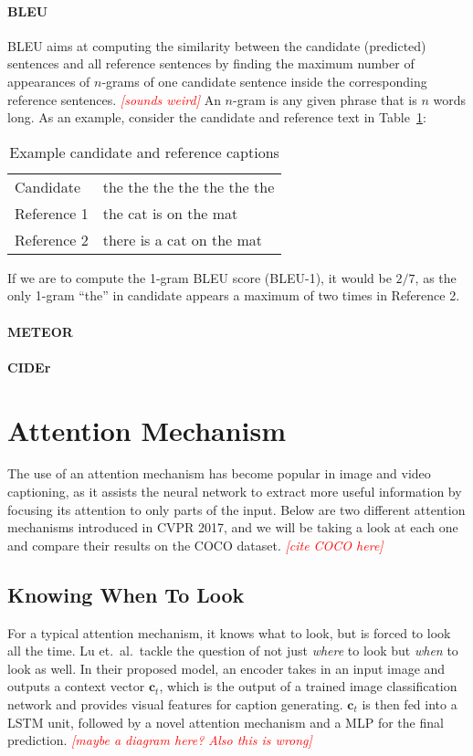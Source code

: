 \documentclass[10pt,twocolumn,letterpaper]{article}
\newcommand{\todo}[1]{\textcolor{red}{{\em [#1]}} }
\newcommand{\tabref}[1]{Table~\ref{tab:#1}}
\newcommand{\bs}[1]{\boldsymbol{#1}}
\begin{document}
\paragraph{BLEU}
BLEU aims at computing the similarity between the candidate (predicted)
sentences and all reference sentences by finding the maximum number of
appearances of $n$-grams of one candidate sentence inside the corresponding
reference sentences.  \todo{sounds weird} An $n$-gram is any given phrase that
is $n$ words long. As an example, consider the candidate and reference text in
\tabref{captions}:
%
\begin{table}[]
\centering
\caption{Example candidate and reference captions}
\label{tab:captions}
\begin{tabular}{ll}
	Candidate   & the the the the the the the \\
	Reference 1 & the cat is on the mat       \\
  Reference 2 & there is a cat on the mat  
\end{tabular}
\end{table}
%
If we are to compute the 1-gram BLEU score (BLEU-1), it would be $2/7$, as the
only 1-gram ``the'' in candidate appears a maximum of two times in Reference
2. 

\paragraph{METEOR}


\paragraph{CIDEr}

\section{Attention Mechanism}

The use of an attention mechanism has become popular in image and video
captioning, as it assists the neural network to extract more useful
information by focusing its attention to only parts of the input. Below are
two different attention mechanisms introduced in CVPR 2017, and we will be
taking a look at each one and compare their results on the COCO dataset.
\todo{cite COCO here}

\subsection{Knowing When To Look}
For a typical attention mechanism, it knows what to look, but is forced to
look all the time. Lu et.\ al.\ tackle the question of not just \textit{where}
to look but \textit{when} to look as well. In their proposed model, an encoder
takes in an input image and outputs a context vector $\bs{c}_t$, which
is the output of a trained image classification network and provides visual
features for caption generating. $\bs{c}_t$ is then fed into a LSTM
unit, followed by a novel attention mechanism and a MLP for the final
prediction. \todo{maybe a diagram here? Also this is wrong}
\end{document}
